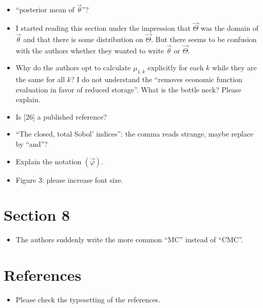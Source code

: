 \documentclass{article}[12pt]
\newcommand{\Referee}[1]{{\color{blue} #1}}
\begin{document}
\begin{itemize}
    \item \Referee{``posterior mean of $\vec{\theta}$''?}
    \item \Referee{I started reading this section under the impression that $\vec{\Theta}$ was the domain of $\vec{\theta}$ and that there is some distribution on $\vec{\Theta}$. But there seems to be confusion with the authors whether they wanted to write $\vec{\theta}$ or $\vec{\Theta}$.}
    \item \Referee{Why do the authors opt to calculate $\mu_{1,k}$ explicitly for each $k$ while they are the same for all $k$? I do not understand the ``removes economic function evaluation in favor of reduced storage''. What is the bottle neck? Please explain.}
    \item \Referee{Is [26] a published reference?}
    \item \Referee{``The closed, total Sobol' indices'': the comma reads strange, maybe replace by ``and''?}
    \item \Referee{Explain the notation $(\vec{\varphi})$.}
    \item \Referee{Figure 3: please increase font size.}
\end{itemize}

\section{Section 8}

\begin{itemize}
    \item \Referee{The authors suddenly write the more common ``MC'' instead of ``CMC''.}
\end{itemize}

\section{References}

\begin{itemize}
    \item \Referee{Please check the typesetting of the references.}
\end{itemize}
\end{document}
